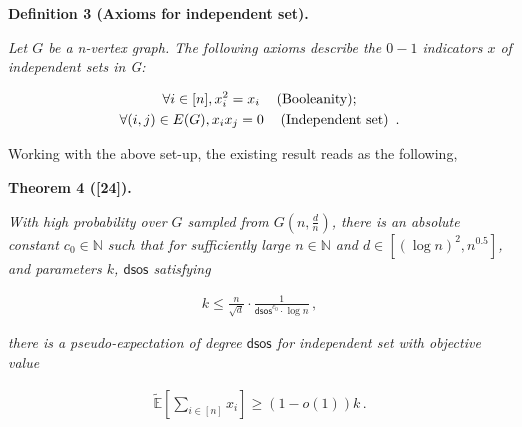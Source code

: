 



\par\medskip\noindent\textbf{
\textbf{Definition 3}\textbf{ }(Axioms for independent set)\textbf{.}
}\par



\emph{Let $G$ be a n-vertex graph. The following axioms describe the $0-1$ indicators $x$ of independent sets in G:}\par


\[\begin{gathered}
\displaystyle\forall i\in[n],x_{i}^{2}=x_{i}\hskip 12.0pt\text{(Booleanity);} \\
\displaystyle\forall(i,j)\in E(G),x_{i}x_{j}=0\hskip 12.0pt\text{(Independent set) }\,.
\end{gathered}\]






Working with the above set-up, the existing result reads as the following,\par





\par\medskip\noindent\textbf{
\textbf{Theorem 4}\textbf{ }([24])\textbf{.}
}\par



\emph{With high probability over $G$ sampled from $G(n,\frac{d}{n})$, there is an absolute constant $c_{0}\in\mathbb{N}$ such that for sufficiently large $n\in\mathbb{N}$ and $d\in[(\log n)^{2},n^{0.5}]$,
and parameters $k$, $\mathsf{dsos}$ satisfying}\par


\[\begin{gathered}
k\leq\frac{n}{\sqrt{d}}\cdot\frac{1}{\mathsf{dsos}^{c_{0}}\cdot\log n}\,,
\end{gathered}\]


\emph{there is a pseudo-expectation of degree $\mathsf{dsos}$ for independent set with objective value}\par


\[\begin{gathered}
\widetilde{\mathbb{E}}[\sum_{i\in[n]}x_{i}]\geq(1-o(1))k\,.
\end{gathered}\]



